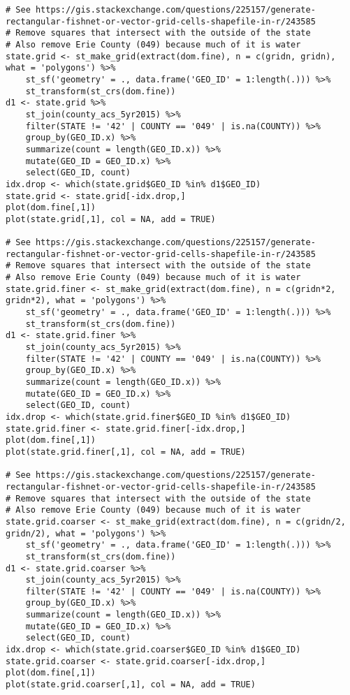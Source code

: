 \documentclass[12pt]{article}
\begin{document}
\begin{footnotesize}
\begin{verbatim}
# See https://gis.stackexchange.com/questions/225157/generate-rectangular-fishnet-or-vector-grid-cells-shapefile-in-r/243585
# Remove squares that intersect with the outside of the state
# Also remove Erie County (049) because much of it is water
state.grid <- st_make_grid(extract(dom.fine), n = c(gridn, gridn), what = 'polygons') %>%
    st_sf('geometry' = ., data.frame('GEO_ID' = 1:length(.))) %>%
    st_transform(st_crs(dom.fine))
d1 <- state.grid %>%
    st_join(county_acs_5yr2015) %>%
    filter(STATE != '42' | COUNTY == '049' | is.na(COUNTY)) %>%
    group_by(GEO_ID.x) %>%
    summarize(count = length(GEO_ID.x)) %>%
    mutate(GEO_ID = GEO_ID.x) %>%
    select(GEO_ID, count)
idx.drop <- which(state.grid$GEO_ID %in% d1$GEO_ID)
state.grid <- state.grid[-idx.drop,]
plot(dom.fine[,1])
plot(state.grid[,1], col = NA, add = TRUE)

# See https://gis.stackexchange.com/questions/225157/generate-rectangular-fishnet-or-vector-grid-cells-shapefile-in-r/243585
# Remove squares that intersect with the outside of the state
# Also remove Erie County (049) because much of it is water
state.grid.finer <- st_make_grid(extract(dom.fine), n = c(gridn*2, gridn*2), what = 'polygons') %>%
    st_sf('geometry' = ., data.frame('GEO_ID' = 1:length(.))) %>%
    st_transform(st_crs(dom.fine))
d1 <- state.grid.finer %>%
    st_join(county_acs_5yr2015) %>%
    filter(STATE != '42' | COUNTY == '049' | is.na(COUNTY)) %>%
    group_by(GEO_ID.x) %>%
    summarize(count = length(GEO_ID.x)) %>%
    mutate(GEO_ID = GEO_ID.x) %>%
    select(GEO_ID, count)
idx.drop <- which(state.grid.finer$GEO_ID %in% d1$GEO_ID)
state.grid.finer <- state.grid.finer[-idx.drop,]
plot(dom.fine[,1])
plot(state.grid.finer[,1], col = NA, add = TRUE)

# See https://gis.stackexchange.com/questions/225157/generate-rectangular-fishnet-or-vector-grid-cells-shapefile-in-r/243585
# Remove squares that intersect with the outside of the state
# Also remove Erie County (049) because much of it is water
state.grid.coarser <- st_make_grid(extract(dom.fine), n = c(gridn/2, gridn/2), what = 'polygons') %>%
    st_sf('geometry' = ., data.frame('GEO_ID' = 1:length(.))) %>%
    st_transform(st_crs(dom.fine))
d1 <- state.grid.coarser %>%
    st_join(county_acs_5yr2015) %>%
    filter(STATE != '42' | COUNTY == '049' | is.na(COUNTY)) %>%
    group_by(GEO_ID.x) %>%
    summarize(count = length(GEO_ID.x)) %>%
    mutate(GEO_ID = GEO_ID.x) %>%
    select(GEO_ID, count)
idx.drop <- which(state.grid.coarser$GEO_ID %in% d1$GEO_ID)
state.grid.coarser <- state.grid.coarser[-idx.drop,]
plot(dom.fine[,1])
plot(state.grid.coarser[,1], col = NA, add = TRUE)


\end{verbatim}
\end{footnotesize}
\end{document}

